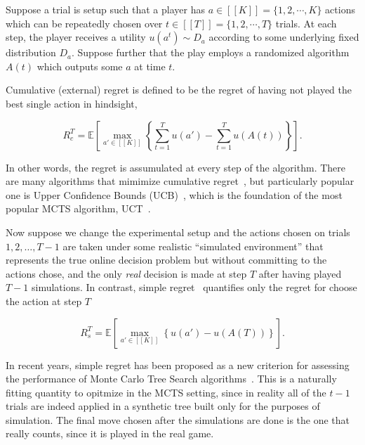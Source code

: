 \documentclass[runningheads,a4paper]{llncs}
\newcommand{\bE}{\mathbb{E}}
\begin{document}
Suppose a trial is setup such that a player has $a \in [[K]] = \{ 1, 2, \cdots , K \}$ actions which can be 
repeatedly chosen over $t \in [[T]] = \{ 1, 2, \cdots, T \}$ trials. 
At each step, the player receives a utility $u(a^t) \sim D_a$ according to some underlying fixed 
distribution $D_a$. Suppose further that the play employs a randomized algorithm $A(t)$ which outputs
some $a$ at time $t$. 

Cumulative (external) regret is defined to be the regret of having not played the best single action 
in hindsight, 

\begin{equation}
R_c^T = \bE \left[ \max_{a' \in [[K]]} \left\{ \sum_{t=1}^T u(a') - \sum_{t=1}^T u(A(t)) \right\} \right].
\end{equation}

In other words, the regret is assumulated at every step of the algorithm. There are many algorithms that 
mimimize cumulative regret~\cite{}, but particularly popular one is Upper Confidence Bounds (UCB)~\cite{UCB}, 
which is the foundation of the most popular MCTS algorithm, UCT~\cite{UCT}.

Now suppose we change the experimental setup and the 
actions chosen on trials $1, 2, \ldots, T-1$ are taken under some realistic ``simulated environment''
that represents the true online decision problem but without committing to the actions chose, 
and the only {\it real} decision is made at step $T$ 
after having played $T-1$ simulations. In contrast, simple regret~\cite{Bubeck11Pure} quantifies only 
the regret for choose the action at step $T$

\begin{equation}
R_s^T = \bE \left[  \max_{a' \in [[K]]} \left\{ u(a') - u(A(T)) \right\} \right].
\end{equation}

In recent years, simple regret has been proposed as a new criterion for assessing the performance of 
Monte Carlo Tree Search algorithms~\cite{Tolpin12MCTSSR,Feldman12BRUE}. This is a naturally fitting quantity 
to opitmize in the MCTS setting, since in reality all of the $t-1$ trials are indeed applied in a synthetic
tree built only for the purposes of simulation. The final move chosen after the simulations are done is the 
one that really counts, since it is played in the real game. 
\end{document}
